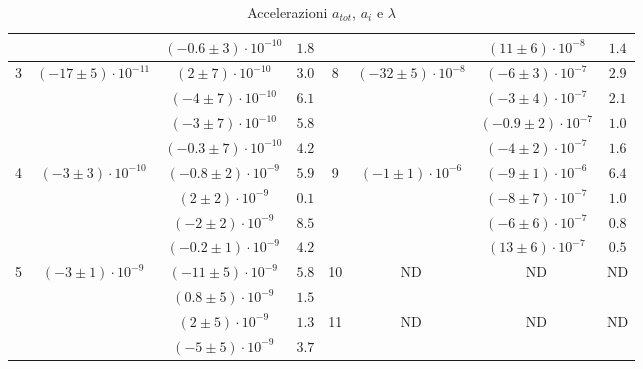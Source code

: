 \documentclass[a4paper,11pt,oneside]{article}
\begin{document}
\begin{table}[h!]
{\begin{tabular}{|c|c|c|c||c|c|c|c|}
        & & $(-0.6 \pm 3)\cdot10^{-10}$ & $1.8$ & & & $(11 \pm 6)\cdot10^{-8}$ & $1.4$ \\
        \hline
        \multirow{4}{*}{3}& \multirow{4}{*}{$(-17 \pm 5)\cdot10^{-11}$}& {\cellcolor[rgb]{0.85,0.85,0.85}}$(2 \pm 7)\cdot10^{-10}$ & {\cellcolor[rgb]{0.85,0.85,0.85}}$3.0$ & \multirow{4}{*}{8}& \multirow{4}{*}{$(-32 \pm 5)\cdot10^{-8}$}& {\cellcolor[rgb]{0.85,0.85,0.85}}$(-6 \pm 3)\cdot10^{-7}$ & {\cellcolor[rgb]{0.85,0.85,0.85}}$2.9$ \\
        & & $(-4 \pm 7)\cdot10^{-10}$ & $6.1$ & & & $(-3 \pm 4)\cdot10^{-7}$ & $2.1$ \\
        & & {\cellcolor[rgb]{0.85,0.85,0.85}}$(-3 \pm 7)\cdot10^{-10}$ & {\cellcolor[rgb]{0.85,0.85,0.85}}$5.8$ & & & {\cellcolor[rgb]{0.85,0.85,0.85}}$(-0.9 \pm 2)\cdot10^{-7}$ & {\cellcolor[rgb]{0.85,0.85,0.85}}$1.0$ \\
        & & $(-0.3 \pm 7)\cdot10^{-10}$ & $4.2$ & & & $(-4 \pm 2)\cdot10^{-7}$ & $1.6$ \\
        \hline
        \multirow{4}{*}{4}& \multirow{4}{*}{$(-3 \pm 3)\cdot10^{-10}$}& {\cellcolor[rgb]{0.85,0.85,0.85}}$(-0.8 \pm 2)\cdot10^{-9}$ & {\cellcolor[rgb]{0.85,0.85,0.85}}$5.9$ & \multirow{4}{*}{9}& \multirow{4}{*}{$(-1 \pm 1)\cdot10^{-6}$}& {\cellcolor[rgb]{0.85,0.85,0.85}}$(-9 \pm 1)\cdot10^{-6}$ & {\cellcolor[rgb]{0.85,0.85,0.85}}$6.4$ \\
        & & $(2 \pm 2)\cdot10^{-9}$ & $0.1$ & & & $(-8 \pm 7)\cdot10^{-7}$ & $1.0$ \\
        & & {\cellcolor[rgb]{0.85,0.85,0.85}}$(-2 \pm 2)\cdot10^{-9}$ & {\cellcolor[rgb]{0.85,0.85,0.85}}$8.5$ & & & {\cellcolor[rgb]{0.85,0.85,0.85}}$(-6 \pm 6)\cdot10^{-7}$ & {\cellcolor[rgb]{0.85,0.85,0.85}}$0.8$ \\
        & & $(-0.2 \pm 1)\cdot10^{-9}$ & $4.2$ & & & $(13 \pm 6)\cdot10^{-7}$ & $0.5$ \\
        \hline
        \multirow{4}{*}{5}& \multirow{4}{*}{$(-3 \pm 1)\cdot10^{-9}$}& {\cellcolor[rgb]{0.85,0.85,0.85}}$(-11 \pm 5)\cdot10^{-9}$ & {\cellcolor[rgb]{0.85,0.85,0.85}}$5.8$ & \multirow{2}{*}{10}& \multirow{2}{*}{ND}& \multirow{2}{*}{ND}& \multirow{2}{*}{ND}\\
        & & $(0.8 \pm 5)\cdot10^{-9}$ & $1.5$ & & & & \\ \cline{5-8}
        & & {\cellcolor[rgb]{0.85,0.85,0.85}}$(2 \pm 5)\cdot10^{-9}$ & {\cellcolor[rgb]{0.85,0.85,0.85}}$1.3$ & \multirow{2}{*}{11} & \multirow{2}{*}{ND}& \multirow{2}{*}{ND}& \multirow{2}{*}{ND}\\
        & & $(-5 \pm 5)\cdot10^{-9}$ & $3.7$ & & & & \\
        \hline
    \end{tabular}}
    \caption{Accelerazioni $a_{tot}$, $a_{i}$ e $\lambda$}
    \label{tab:comp_acc}
\end{table}
\end{document}
